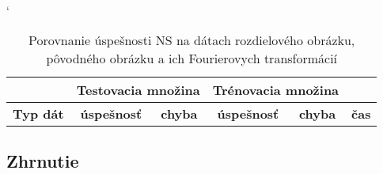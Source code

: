 \todo 

\begin{table}[h]
\catcode` %
\centering
\begin{tabular}{|l|c|c|c|c|c|}
\cline{2-5}
\multicolumn{1}{l}{} & \multicolumn{2}{|c|}{\textbf{Testovacia množina}} & \multicolumn{2}{c|}{\textbf{Trénovacia množina}} & \multicolumn{1}{l}{}\\ 
\hline
\textbf{Typ dát} & \textbf{úspešnosť} & \textbf{chyba} & \textbf{úspešnosť} & \textbf{chyba} & \textbf{čas} \\ \hline
\end{tabular}
\caption{Porovnanie úspešnosti NS na dátach rozdielového obrázku, pôvodného obrázku a ich Fourierovych transformácií}
\label{tab:neuraldatacmp}
\end{table}



\subsection{Zhrnutie}


\todo 



